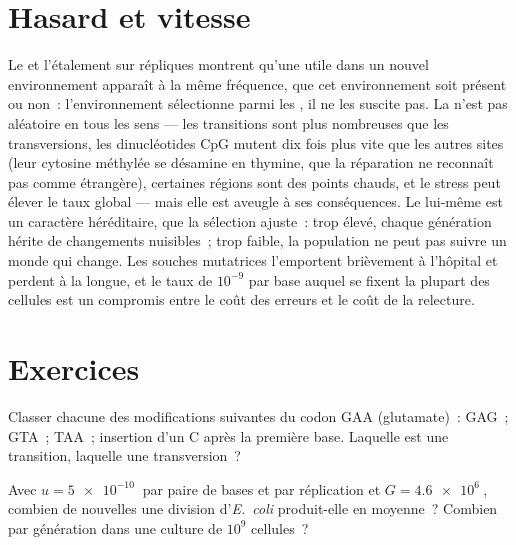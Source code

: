 \section{Hasard et vitesse}

\begin{proposition}\label{prop:b2:genome-diversification:random}
Le  et l'étalement sur répliques montrent qu'une
 utile dans un nouvel environnement apparaît à la même
fréquence, que cet environnement soit présent ou non~: l'environnement
sélectionne parmi les , il ne les suscite pas. La 
n'est pas aléatoire en tous les sens --- les transitions sont plus
nombreuses que les transversions, les dinucléotides CpG mutent dix fois
plus vite que les autres sites (leur cytosine méthylée se désamine en
thymine, que la réparation ne reconnaît pas comme étrangère), certaines
régions sont des points chauds, et le stress peut élever le taux
global --- mais elle est aveugle à ses conséquences. Le  lui-même est un caractère héréditaire, que la sélection
ajuste~: trop élevé, chaque génération hérite de changements nuisibles~;
trop faible, la population ne peut pas suivre un monde qui change. Les
souches mutatrices l'emportent brièvement à l'hôpital et perdent à la
longue, et le taux de
$10^{-9}$ par base auquel se fixent la plupart des cellules est un
compromis entre le coût des erreurs et le coût de la relecture.
\end{proposition}

\section{Exercices}

\begin{exercise}[$\star$]\label{exo:b2:genome-diversification:1}
Classer chacune des modifications suivantes du codon GAA (glutamate)~:
GAG~; GTA~; TAA~; insertion d'un C après la première base. Laquelle est
une transition, laquelle une transversion~?
\end{exercise}

\begin{exercise}[$\star$]\label{exo:b2:genome-diversification:2}
Avec $u = \qty{5e-10}{}$ par paire de bases et par réplication et $G =
\qty{4.6e6}{}$, combien de  nouvelles une division
d'\emph{E.~coli} produit-elle en moyenne~? Combien par génération dans
une culture de
$10^{9}$ cellules~?
\end{exercise}

